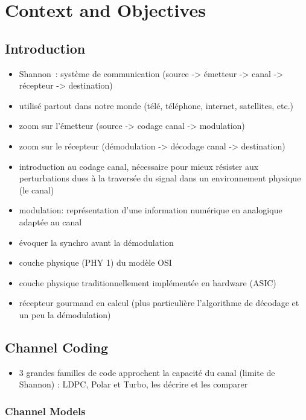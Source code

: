 \graphicspath{{main/chapter1/fig/}}

\chapter{Context and Objectives}

\section{Introduction}

\begin{itemize}
  \item Shannon~\cite{Shannon1948}: système de communication (source -> émetteur
    -> canal -> récepteur -> destination)
  \item utilisé partout dans notre monde (télé, téléphone, internet, satellites,
    etc.)
  \item zoom sur l'émetteur (source -> codage canal -> modulation)
  \item zoom sur le récepteur (démodulation -> décodage canal -> destination)
  \item introduction au codage canal, nécessaire pour mieux résister aux
    perturbations dues à la traversée du signal dans un environnement physique
    (le canal)
  \item modulation: représentation d'une information numérique en analogique
    adaptée au canal
  \item évoquer la synchro avant la démodulation
  \item couche physique (PHY 1) du modèle OSI
  \item couche physique traditionnellement implémentée en hardware (ASIC)
  \item récepteur gourmand en calcul (plus particulière l'algorithme de décodage
    et un peu la démodulation)
\end{itemize}

\section{Channel Coding}

\begin{itemize}
  \item 3 grandes familles de code approchent la capacité du canal (limite de
    Shannon) : LDPC, Polar et Turbo, les décrire et les comparer
\end{itemize}

\subsection{Channel Models}

